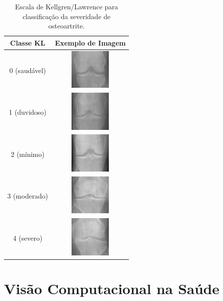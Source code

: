 \begin{table}[htbp]
    \centering
    \begin{tabular}{|c|c|}
        \hline
        \textbf{Classe KL} & \textbf{Exemplo de Imagem} \\
        \hline
        0 (saudável) & \includegraphics[width=2cm]{figs/KL0-sample.png} \\
        \hline
        1 (duvidoso) & \includegraphics[width=2cm]{figs/KL1-sample.png} \\
        \hline
        2 (mínimo) & \includegraphics[width=2cm]{figs/KL2-sample.png} \\
        \hline
        3 (moderado) & \includegraphics[width=2cm]{figs/KL3-sample.png} \\
        \hline
        4 (severo) & \includegraphics[width=2cm]{figs/KL4-sample.png} \\
        \hline
    \end{tabular}
    \caption{Escala de Kellgren/Lawrence para classificação da severidade de osteoartrite.}
    \label{tabela-kl}
\end{table}

\section{Visão Computacional na Saúde}\label{sec:visao-computacional}

